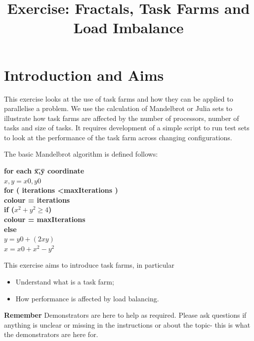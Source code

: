 \documentclass{article}
\title{Exercise: Fractals, Task Farms and Load Imbalance}
\begin{document}
\makeEPCCtitle

\vspace*{1cm}

\section{Introduction and Aims} 


This exercise looks at the use of task farms and how they can be applied to parallelise a problem. We use the calculation of Mandelbrot or Julia sets to illustrate how task farms are affected by the number of 
processors, number of tasks and size of tasks. It  requires development of a simple script to run test sets to look at the performance of the task farm across changing configurations. 

The basic Mandelbrot algorithm is defined follows:
\begin{tabbing}
\bf{for }\= \bf{each }\= x\=,\=y \bf{c}\=\bf{oord}\=\bf{inate} \\              \>  $x,y = x0,y0$ \\                                                           \>  \bf{for ( iterations \textless   maxIterations )} \\                       \> \>  colour = iterations \\                                                  \> \> \bf{if ($x^2 + y^2 \geq 4$)} \\                                          \> \> \> colour = maxIterations \\                                             \> \> \bf{else} \\                                                             \> \> \> $y = y0 + (2xy)$ \\                                                   \> \> \> $x = x0 + x^2 - y^2$ \\                                               \end{tabbing}  

This exercise aims to introduce task farms, in particular
\begin{itemize}
\item Understand what is a task farm;
\item How performance is affected by load balancing.
\end{itemize}


\textbf{Remember} Demonstrators are here to help as required. Please ask questions if anything is unclear or missing in the instructions or about the topic- this is what the demonstrators are here for.
\end{document}
